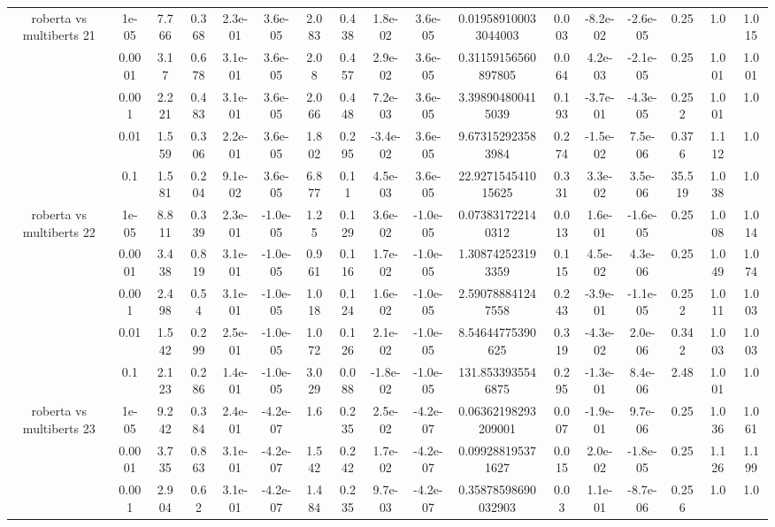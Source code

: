 \begin{tabular}{|c|c|c|c|c|c|c|c|c|c|c|c|c|c|c|c|c|}
\hline
\multirow{5}{*}{roberta  vs multiberts 21} & 1e-05 & 7.766 & 0.368 & 2.3e-01 & 3.6e-05 & 2.083 & 0.438 & 1.8e-02 & 3.6e-05 & 0.019589100033044003 & 0.003 & -8.2e-02 & -2.6e-05 & 0.25 & 1.0 & 1.015 \\
 & 0.0001 & 3.17 & 0.678 & 3.1e-01 & 3.6e-05 & 2.08 & 0.457 & 2.9e-02 & 3.6e-05 & 0.31159156560897805 & 0.064 & 4.2e-03 & -2.1e-05 & 0.25 & 1.001 & 1.001 \\
 & 0.001 & 2.221 & 0.483 & 3.1e-01 & 3.6e-05 & 2.066 & 0.448 & 7.2e-03 & 3.6e-05 & 3.398904800415039 & 0.193 & -3.7e-01 & -4.3e-05 & 0.252 & 1.001 & 1.0 \\
 & 0.01 & 1.559 & 0.306 & 2.2e-01 & 3.6e-05 & 1.802 & 0.295 & -3.4e-02 & 3.6e-05 & 9.673152923583984 & 0.274 & -1.5e-02 & 7.5e-06 & 0.376 & 1.112 & 1.0 \\
 & 0.1 & 1.581 & 0.204 & 9.1e-02 & 3.6e-05 & 6.877 & 0.11 & 4.5e-03 & 3.6e-05 & 22.927154541015625 & 0.331 & 3.3e-02 & 3.5e-06 & 35.519 & 1.038 & 1.0 \\
\hline
\multirow{5}{*}{roberta  vs multiberts 22} & 1e-05 & 8.811 & 0.339 & 2.3e-01 & -1.0e-05 & 1.25 & 0.129 & 3.6e-02 & -1.0e-05 & 0.073831722140312 & 0.013 & 1.6e-01 & -1.6e-05 & 0.25 & 1.008 & 1.014 \\
 & 0.0001 & 3.438 & 0.819 & 3.1e-01 & -1.0e-05 & 0.961 & 0.116 & 1.7e-02 & -1.0e-05 & 1.308742523193359 & 0.115 & 4.5e-02 & 4.3e-06 & 0.25 & 1.049 & 1.074 \\
 & 0.001 & 2.498 & 0.54 & 3.1e-01 & -1.0e-05 & 1.018 & 0.124 & 1.6e-02 & -1.0e-05 & 2.590788841247558 & 0.243 & -3.9e-01 & -1.1e-05 & 0.252 & 1.011 & 1.003 \\
 & 0.01 & 1.542 & 0.299 & 2.5e-01 & -1.0e-05 & 1.072 & 0.126 & 2.1e-02 & -1.0e-05 & 8.54644775390625 & 0.319 & -4.3e-02 & 2.0e-06 & 0.342 & 1.003 & 1.003 \\
 & 0.1 & 2.123 & 0.286 & 1.4e-01 & -1.0e-05 & 3.029 & 0.088 & -1.8e-02 & -1.0e-05 & 131.8533935546875 & 0.295 & -1.3e-01 & 8.4e-06 & 2.48 & 1.001 & 1.0 \\
\hline
\multirow{5}{*}{roberta  vs multiberts 23} & 1e-05 & 9.242 & 0.384 & 2.4e-01 & -4.2e-07 & 1.6 & 0.235 & 2.5e-02 & -4.2e-07 & 0.06362198293209001 & 0.007 & -1.9e-01 & 9.7e-06 & 0.25 & 1.036 & 1.061 \\
 & 0.0001 & 3.735 & 0.863 & 3.1e-01 & -4.2e-07 & 1.542 & 0.242 & 1.7e-02 & -4.2e-07 & 0.099288195371627 & 0.015 & 2.0e-02 & -1.8e-05 & 0.25 & 1.126 & 1.199 \\
 & 0.001 & 2.904 & 0.62 & 3.1e-01 & -4.2e-07 & 1.484 & 0.235 & 9.7e-03 & -4.2e-07 & 0.35878598690032903 & 0.03 & 1.1e-01 & -8.7e-06 & 0.256 & 1.0 & 1.0 \\

\end{tabular}
